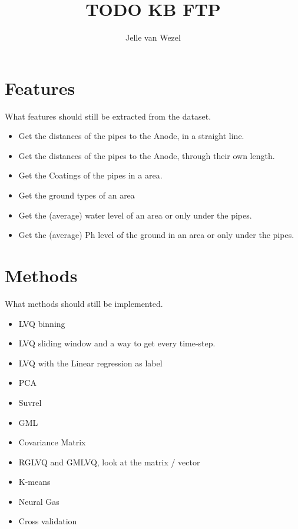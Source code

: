 \documentclass{article}
\begin{document}
\title{TODO KB FTP}
\author{Jelle van Wezel}

\maketitle

\section{Features}

What features should still be extracted from the dataset.

\begin{itemize}
\item Get the distances of the pipes to the Anode, in a straight line.
\item Get the distances of the pipes to the Anode, through their own length.
\item Get the Coatings of the pipes in a area.
\item Get the ground types of an area
\item Get the (average) water level of an area or only under the pipes.
\item Get the (average) Ph level of the ground in an area or only under the pipes.
\end{itemize}

\section{Methods}

What methods should still be implemented.

\begin{itemize}
\item LVQ binning
\item LVQ sliding window and a way to get every time-step.
\item LVQ with the Linear regression as label
\item PCA
\item Suvrel
\item GML
\item Covariance Matrix
\item RGLVQ and GMLVQ, look at the matrix / vector
\item K-means
\item Neural Gas
\item Cross validation
\end{itemize}
\end{document}
